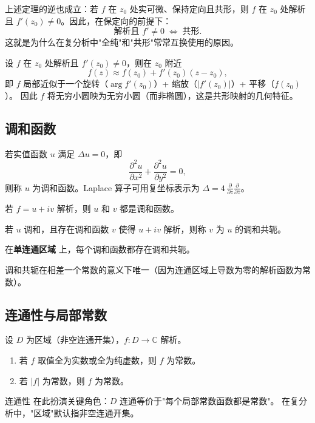 \begin{remark}
上述定理的逆也成立：若 $f$ 在 $z_0$ 处实可微、保持定向且共形，则 $f$ 在 $z_0$ 处解析且 $f'(z_0) \neq 0$。因此，在保定向的前提下：
\[
  \text{解析且 } f' \neq 0 \;\Longleftrightarrow\; \text{共形}.
\]
这就是为什么在复分析中"全纯"和"共形"常常互换使用的原因。
\end{remark}

\begin{theorem}[共形映射的局部形式]
设 $f$ 在 $z_0$ 处解析且 $f'(z_0) \neq 0$，则在 $z_0$ 附近
\[
  f(z) \approx f(z_0) + f'(z_0)(z - z_0),
\]
即 $f$ 局部近似于一个旋转（$\arg f'(z_0)$）+ 缩放（$|f'(z_0)|$）+ 平移（$f(z_0)$）。
因此 $f$ 将无穷小圆映为无穷小圆（而非椭圆），这是共形映射的几何特征。
\end{theorem}

\subsection{调和函数}

\begin{definition}
若实值函数 $u$ 满足 $\Delta u = 0$，即
\[
  \frac{\partial^2 u}{\partial x^2} + \frac{\partial^2 u}{\partial y^2} = 0,
\]
则称 $u$ 为调和函数。Laplace 算子可用复坐标表示为 $\Delta = 4\,\frac{\partial}{\partial z}\frac{\partial}{\partial \bar{z}}$。
\end{definition}

\begin{theorem}
若 $f = u + iv$ 解析，则 $u$ 和 $v$ 都是调和函数。
\end{theorem}

\begin{definition}
若 $u$ 调和，且存在调和函数 $v$ 使得 $u + iv$ 解析，则称 $v$ 为 $u$ 的调和共轭。
\end{definition}

\begin{theorem}
在\textbf{单连通区域}  上，每个调和函数都存在调和共轭。
\end{theorem}

\begin{remark}
调和共轭在相差一个常数的意义下唯一（因为连通区域上导数为零的解析函数为常数）。
\end{remark}

\subsection{连通性与局部常数}

\begin{corollary}
设 $D$ 为区域（非空连通开集），$f: D \to \mathbb{C}$ 解析。
\begin{enumerate}  \item 若 $f$ 取值全为实数或全为纯虚数，则 $f$ 为常数。
  \item 若 $|f|$ 为常数，则 $f$ 为常数。
\end{enumerate}
\end{corollary}

\begin{remark}
连通性  在此扮演关键角色：$D$ 连通等价于"每个局部常数函数都是常数"。
在复分析中，"区域"默认指非空连通开集。
\end{remark}
